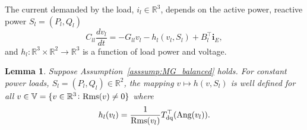 \documentclass[journal, final, letterpaper]{IEEEtran}
\newtheorem{lemma}[theorem]{Lemma}
\newcommand{\ts}[1]{{\textnormal{#1}}}
\newcommand{\Rset}{\mathbb{R}}
\newcommand{\mb}{\mathbf}
\newcommand{\mbb}{\mathbb}
\newcommand{\myreferences}{/Users/prbalm/Dropbox/Reports/library.bib}
\begin{document}
The current demanded by the load, $i_{l}\in\Rset^{3}$, depends on the active power, reactive power $S_l = (P_l,Q_l)$
%
\begin{equation}
  	C_{ll}\frac{dv_{l}}{dt}= -G_{ll} v_{l} - h_l(v_l,S_l) + B_l^\top\mb{i}_{E},
\label{eq:load_voltage}
\end{equation}
%
and $h_l\colon\Rset^{3}\times\Rset^{2}\rightarrow\Rset^{3}$ is a function of load power and voltage.
%
\begin{lemma}
	Suppose Assumption~\ref{asssump:MG_balanced} holds. For constant power loads, $S_l=(P_l,Q_l)\in\Rset^{2}$, the mapping $v\mapsto h(v,S_l)$ is well defined for all $v\in\mbb{V}= \{v\in\Rset^3\colon \ts{Rms}(v) \neq 0\}$ where
	\begin{equation}
		h_l(v_l) = \frac{1}{\ts{Rms}(v_l)}T_\ts{dq}^\top(\ts{Ang}(v_l)).
	\label{eq:cpl_current}  
	\end{equation}
	\label{lem:cpl_current}
\end{lemma}


\appendix
%
%
\end{document}
